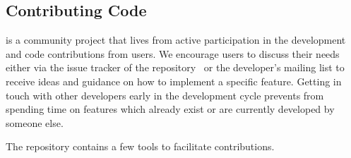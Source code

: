 \subsection{Contributing Code}
\apsq is a community project that lives from active participation in the development and code contributions from users.
We encourage users to discuss their needs either via the issue tracker of the repository~\cite{ap2-issue-tracker} or the developer's mailing list to receive ideas and guidance on how to implement a specific feature.
Getting in touch with other developers early in the development cycle prevents from spending time on features which already exist or are currently developed by someone else.

The repository contains a few tools to facilitate contributions. 

